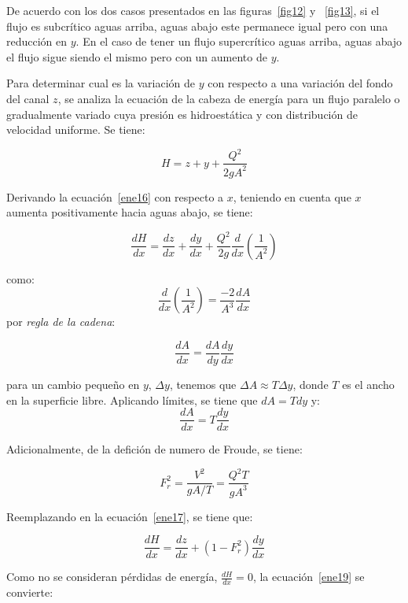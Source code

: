\documentclass[11pt, oneside]{article}
\begin{document}
De acuerdo con los dos casos presentados en las figuras~\ref{fig12} y ~\ref{fig13}, si el flujo es subcr\'itico aguas arriba, aguas abajo este permanece igual pero con una reducci\'on en $y$. En el caso de tener un flujo supercr\'itico aguas arriba, aguas abajo el flujo sigue siendo el mismo pero con un aumento de $y$.

Para determinar cual es la variaci\'on de $y$ con respecto a una variaci\'on del fondo del canal $z$, se analiza la ecuaci\'on de la cabeza de energ\'ia para un flujo paralelo o gradualmente variado cuya presi\'on es hidroest\'atica y con distribuci\'on de velocidad uniforme. Se tiene:

\begin{equation}
H = z + y + \frac{Q^2}{2g A^2}
\label{ene16}
\end{equation}

Derivando la ecuaci\'on~\ref{ene16} con respecto a $x$, teniendo en cuenta que $x$ aumenta positivamente hacia aguas abajo, se tiene:

\begin{equation}
\frac{dH}{dx} = \frac{dz}{dx} + \frac{dy}{dx} + \frac{Q^2}{2g}\frac{d}{dx}\left( \frac{1}{A^2} \right)
\label{ene17}
\end{equation}

como:
$$
\frac{d}{dx}\left( \frac{1}{A^2} \right) = \frac{-2}{A^3}\frac{dA}{dx}
$$
por \emph{regla de la cadena}:

$$
\frac{dA}{dx} = \frac{dA}{dy}\frac{dy}{dx}
$$

para un cambio pequeño en $y$, $\Delta y$, tenemos que $\Delta A \approx T \Delta y$, donde $T$ es el ancho en la superficie libre. Aplicando l\'imites, se tiene que $dA = Tdy$ y:
$$
\frac{dA}{dx} = T \frac{dy}{dx}
$$

Adicionalmente, de la defici\'on de numero de Froude, se tiene:

\begin{equation}
F_r^2 = \frac{V^2}{g A/T} = \frac{Q^2 T}{g A^3}
\label{ene18}
\end{equation}

Reemplazando en la ecuaci\'on~\ref{ene17}, se tiene que:

\begin{equation}
\frac{dH}{dx} = \frac{dz}{dx} + \left( 1- F_r^2 \right)\frac{dy}{dx}
\label{ene19}
\end{equation}

Como no se consideran p\'erdidas de energ\'ia, $\frac{dH}{dx} = 0$, la ecuaci\'on~\ref{ene19} se convierte:
\end{document}
